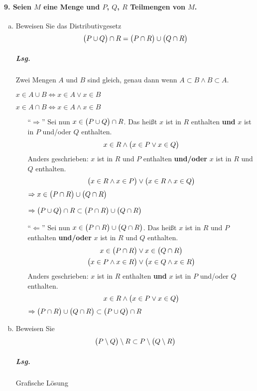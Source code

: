 \documentclass{scrreprt}
\begin{document}
\newpage
\paragraph{9. Seien $M$ eine Menge und $P$, $Q$, $R$ Teilmengen von $M$.}

\begin{enumerate}[a)]
\item Beweisen Sie das Distributivgesetz
  \[
    \qty\big(P \cup Q) \cap R = \qty\big(P \cap R) \cup \qty\big(Q \cap R)
  \]

  \subparagraph{Lsg.} Zwei Mengen $A$ und $B$ sind gleich, genau dann wenn
  $A \subset B \land B \subset A$.

  $x \in A \cup B \iff x \in A \lor x \in B$

  $x \in A \cap B \iff x \in A \land x \in B$
  \begin{itemize}
  \item[``$\Rightarrow$''] Sei nun $x \in \qty\big(P \cup Q) \cap R$.
    Das heißt $x$ ist in $R$ enthalten \textbf{und} $x$ ist in $P$ und/oder
    $Q$ enthalten.
    \[
      x \in R \land \qty\big(x \in P \lor x \in Q)
    \]
    Anders geschrieben: $x$ ist in $R$ und $P$ enthalten \textbf{und/oder}
    $x$ ist in $R$ und $Q$ enthalten.
    \[
      \qty\big(x \in R \land x \in P) \lor \qty\big(x \in R \land x \in Q)
    \]
    $\Rightarrow x \in \qty\big(P \cap R) \cup \qty\big(Q \cap R)$

    $\Rightarrow \qty\big(P \cup Q) \cap R \subset \qty\big(P \cap R) \cup \qty\big(Q \cap R)$

  \item[``$\Leftarrow$''] Sei nun $x \in \qty\big(P \cap R) \cup \qty\big(Q \cap R)$.
    Das heißt $x$ ist in $R$ und $P$ enthalten \textbf{und/oder} $x$ ist in $R$ und
    $Q$ enthalten.
    \begin{align*}
      x \in \qty\big(P \cap R) &\lor x \in \qty\big(Q \cap R) \\
      \qty\big(x \in P \land x \in R) &\lor \qty\big(x \in Q \land x \in R)
    \end{align*}
    Anders geschrieben: $x$ ist in $R$ enthalten \textbf{und} $x$ ist in $P$ und/oder
    $Q$ enthalten.
    \[
       x \in R \land \qty\big(x \in P \lor x \in Q)
    \]
    $\Rightarrow \qty\big(P \cap R) \cup \qty\big(Q \cap R) \subset \qty\big(P \cup Q) \cap R$
  \end{itemize}

\item Beweisen Sie
  \[
    \qty\big(P \setminus Q) \setminus R \subset P \setminus \qty\big(Q \setminus R)
  \]
  \subparagraph{Lsg.} Grafische Lösung


\end{enumerate}
\end{document}
